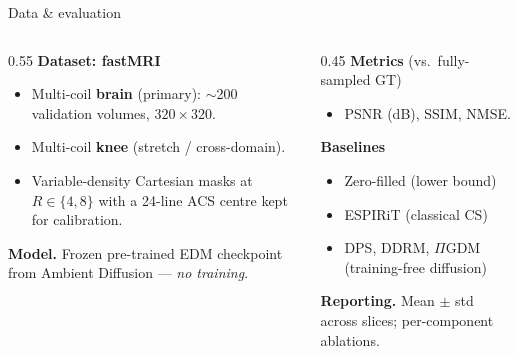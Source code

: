 \documentclass[aspectratio=169]{beamer}
\newcommand{\PIGDM}{$\Pi$GDM}
\begin{document}
\begin{frame}{Data \& evaluation}
  \begin{columns}[T]
    \begin{column}{0.55\textwidth}
      \textbf{Dataset: fastMRI} \cite{zbontar2018fastmri}
      \begin{itemize}
        \item Multi-coil \textbf{brain} (primary): $\sim$200 validation volumes, $320\!\times\!320$.
        \item Multi-coil \textbf{knee} (stretch / cross-domain).
        \item Variable-density Cartesian masks at $R{\in}\{4,8\}$ with a 24-line ACS centre kept for calibration.
      \end{itemize}
      \vspace{0.4em}
      \textbf{Model.} Frozen pre-trained EDM checkpoint from Ambient Diffusion \cite{daras2025adps} --- \emph{no training}.
    \end{column}
    \begin{column}{0.45\textwidth}
      \textbf{Metrics} (vs.\ fully-sampled GT)
      \begin{itemize}
        \item PSNR (dB), SSIM, NMSE.
      \end{itemize}
      \vspace{0.4em}
      \textbf{Baselines}
      \begin{itemize}
        \item Zero-filled (lower bound)
        \item ESPIRiT \cite{uecker2014espirit} (classical CS)
        \item DPS, DDRM, \PIGDM{} (training-free diffusion)
      \end{itemize}
      \vspace{0.4em}
      \textbf{Reporting.} Mean $\pm$ std across slices; per-component ablations.
    \end{column}
  \end{columns}
\end{frame}
\end{document}
